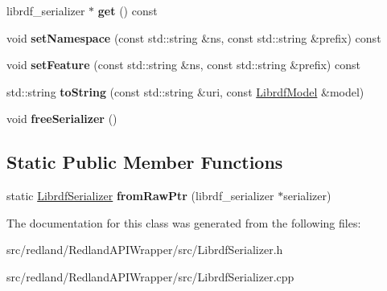 \begin{DoxyCompactItemize}
librdf\+\_\+serializer $\ast$ {\bfseries get} () const
\item 
\mbox{\label{classredland_1_1LibrdfSerializer_ab621a575b7244c9d39e756b5e133766b}} 
void {\bfseries set\+Namespace} (const std\+::string \&ns, const std\+::string \&prefix) const
\item 
\mbox{\label{classredland_1_1LibrdfSerializer_abe500f5c5a1de1bdac86ab196a002b46}} 
void {\bfseries set\+Feature} (const std\+::string \&ns, const std\+::string \&prefix) const
\item 
\mbox{\label{classredland_1_1LibrdfSerializer_ac205990ca1dbf0ff1e56ea45e82ec8d2}} 
std\+::string {\bfseries to\+String} (const std\+::string \&uri, const \hyperlink{classredland_1_1LibrdfModel}{Librdf\+Model} \&model)
\item 
\mbox{\label{classredland_1_1LibrdfSerializer_aa185a5c5708bf4b08dfa5eb6a8b897b1}} 
void {\bfseries free\+Serializer} ()
\end{DoxyCompactItemize}
\subsection*{Static Public Member Functions}
\begin{DoxyCompactItemize}
\item 
\mbox{\label{classredland_1_1LibrdfSerializer_a58915bb2aa6b7c0eb438b5cc0148ef45}} 
static \hyperlink{classredland_1_1LibrdfSerializer}{Librdf\+Serializer} {\bfseries from\+Raw\+Ptr} (librdf\+\_\+serializer $\ast$serializer)
\end{DoxyCompactItemize}


The documentation for this class was generated from the following files\+:\begin{DoxyCompactItemize}
\item 
src/redland/\+Redland\+A\+P\+I\+Wrapper/src/Librdf\+Serializer.\+h\item 
src/redland/\+Redland\+A\+P\+I\+Wrapper/src/Librdf\+Serializer.\+cpp\end{DoxyCompactItemize}
